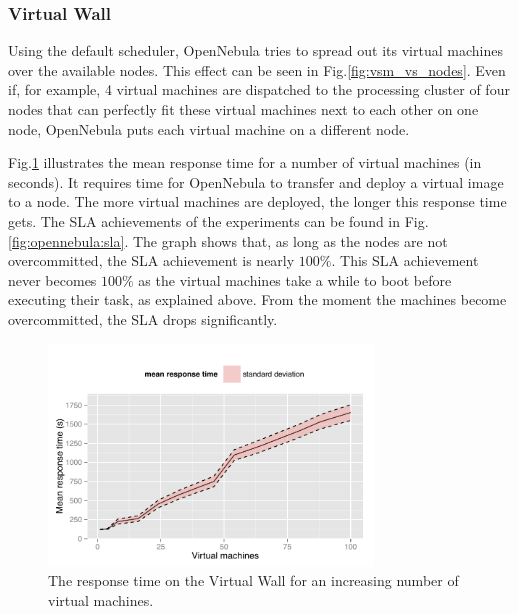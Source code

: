 \documentclass[conference, 10pt]{IEEEtran}
\begin{document}
\subsubsection{Virtual Wall}
Using the default scheduler, OpenNebula tries to spread out its virtual machines over the available nodes. This effect can be seen in Fig.\xspace\ref{fig:vsm_vs_nodes}. Even if, for example, 4 virtual machines are dispatched to the processing cluster of four nodes that can perfectly fit these virtual machines next to each other on one node, OpenNebula puts each virtual machine on a different node.

Fig.\xspace\ref{fig:opennebula:responsetime} illustrates the mean response time for a number of virtual machines (in seconds). It requires time for OpenNebula to transfer and deploy a virtual image to a node. The more virtual machines are deployed, the longer this response time gets. 
The SLA achievements of the experiments can be found in Fig.\xspace\ref{fig:opennebula:sla}. The graph shows that, as long as the nodes are not overcommitted, the SLA achievement is nearly $100\%$. This SLA achievement never becomes $100\%$ as the virtual machines take a while to boot before executing their task, as explained above. From the moment the machines become overcommitted, the SLA drops significantly.

\begin{figure}
\centering
\includegraphics[width=3.4in]{includes/OpenNebula_responsetime}
\caption{The response time on the Virtual Wall for an increasing number of virtual machines.\protect\footnotemark}
\label{fig:opennebula:responsetime}
\end{figure}
\end{document}
